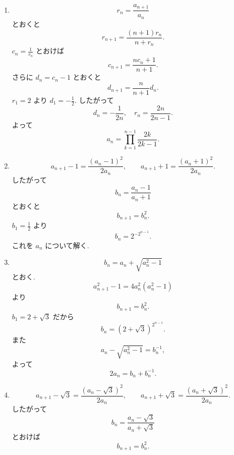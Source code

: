 \begin{enumerate}[label=\textbf{問\arabic*.},leftmargin=3.8em,format=\bookitemlink{practice-advanced}{solution}{problem}]
\[          \]
              さらにもう一度差を取ると
          \[
            x_{n+1}-3x_n+x_{n-1}=0.
          \]
              \(x_1=0,x_2=1\). 特性方程式
          \[
            r^2-3r+1=0
          \]
              の根を
          \[
            \alpha=\frac{3+\sqrt5}{2},\quad
            \beta=\frac{3-\sqrt5}{2}
          \]
              とすると
          \[
            x_n=\frac{\alpha^{n-1}-\beta^{n-1}}{\sqrt5}.
          \]
              よって \(a_n=2^{x_n}\).
        \item \[
            r_n=\frac{a_{n+1}}{a_n}
          \]
              とおくと
          \[
            r_{n+1}=\frac{(n+1)r_n}{n+r_n}.
          \]
              \(c_n=\displaystyle \frac{1}{r_n}\) とおけば
          \[
            c_{n+1}=\frac{nc_n+1}{n+1}.
          \]
              さらに \(d_n=c_n-1\) とおくと
          \[
            d_{n+1}=\frac{n}{n+1}d_n.
          \]
              \(r_1=2\) より \(d_1=-\displaystyle \frac{1}{2}\). したがって
          \[
            d_n=-\frac1{2n},
            \quad
            r_n=\frac{2n}{2n-1}.
          \]
              よって
          \[
            a_n=\prod_{k=1}^{n-1}\frac{2k}{2k-1}.
          \]
        \item \[
            a_{n+1}-1=\frac{(a_n-1)^2}{2a_n},\qquad
            a_{n+1}+1=\frac{(a_n+1)^2}{2a_n}.
          \]
              したがって
          \[
            b_n=\frac{a_n-1}{a_n+1}
          \]
              とおくと
          \[
            b_{n+1}=b_n^2.
          \]
              \(b_1=\displaystyle \frac{1}{2}\) より
          \[
            b_n=2^{-2^{n-1}}.
          \]
              これを \(a_n\) について解く.
        \item \[
            b_n=a_n+\sqrt{a_n^2-1}
          \]
              とおく.
          \[
            a_{n+1}^2-1=4a_n^2(a_n^2-1)
          \]
              より
          \[
            b_{n+1}=b_n^2.
          \]
              \(b_1=2+\sqrt3\) だから
          \[
            b_n=(2+\sqrt3)^{2^{n-1}}.
          \]
              また
          \[
            a_n-\sqrt{a_n^2-1}=b_n^{-1},
          \]
              よって
          \[
            2a_n=b_n+b_n^{-1}.
          \]
        \item \[
            a_{n+1}-\sqrt3
            =\frac{(a_n-\sqrt3)^2}{2a_n},
            \qquad
            a_{n+1}+\sqrt3
            =\frac{(a_n+\sqrt3)^2}{2a_n}.
          \]
              したがって
          \[
            b_n=\frac{a_n-\sqrt3}{a_n+\sqrt3}
          \]
              とおけば
          \[
            b_{n+1}=b_n^2.
          \]

\end{enumerate}
